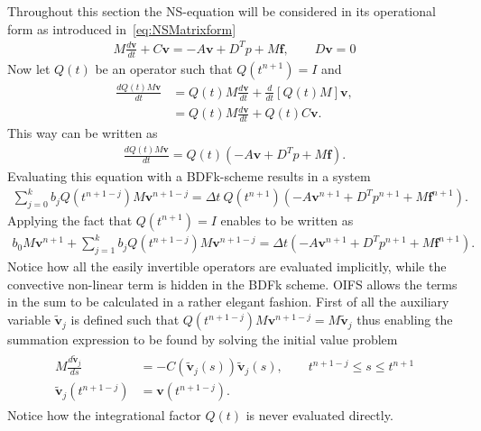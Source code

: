 Throughout this section the NS-equation will be considered in its operational form as introduced in~\ref{eq:NSMatrixform}
%
\begin{align}
    M\frac{d \mathbf{v}}{dt} + C\mathbf{v} = -A\mathbf{v} +D^T p +M\mathbf{f}, \qquad D\mathbf{v} = 0
    \label{eq:NSoperator}
\end{align}
%
Now let $Q(t)$ be an operator such that $Q(t^{n+1}) = I$ and 
%
\begin{align}
    \frac{dQ(t)M\mathbf{v}}{dt} &=  Q(t)M\frac{d\mathbf{v}}{dt} + \frac{d}{dt}\left[  Q(t)M\right]\mathbf{v},\\
    &= Q(t)M\frac{d\mathbf{v}}{dt} + Q(t)C\mathbf{v}. 
    \label{eq:integrationalfactor}
\end{align}
%
This way  can be written as 
\begin{align}
    \frac{d Q(t)M\mathbf{v}}{dt} =Q(t)( -A\mathbf{v} +D^T p +M\mathbf{f}).
    \label{eq:NSoperatorOIFS}
\end{align}
Evaluating this equation with a BDFk-scheme results in a system 
\begin{align}
    \sum_{j=0}^{k}b_jQ(t^{n+1-j})M\mathbf{v}^{n+1-j} =\Delta t \: Q(t^{n+1})( -A\mathbf{v}^{n+1} +D^T p^{n+1} +M\mathbf{f}^{n+1}).
    \label{eq:NSOIFS1}
\end{align}
Applying the fact that $Q(t^{n+1}) = I$ enables  to be written as 
\begin{align}
    b_0M\mathbf{v}^{n+1} + \sum_{j=1}^{k}b_jQ(t^{n+1-j})M\mathbf{v}^{n+1-j} 
    =\Delta t ( -A\mathbf{v}^{n+1} +D^T p^{n+1} +M\mathbf{f}^{n+1}).
    \label{eq:NSOIFS1}
\end{align}
Notice how all the easily invertible operators are evaluated implicitly, while the convective non-linear term is hidden in the BDFk scheme. 
OIFS allows the terms in the sum to be calculated in a rather elegant fashion.
First of all the auxiliary variable $\tilde{\mathbf{v}}_j$ is defined such that $Q(t^{n+1-j})M\mathbf{v}^{n+1-j} = M\tilde{\mathbf{v}}_j$
thus enabling the summation expression to be found by solving the initial value problem 
\begin{align}
    \begin{split}
    M\frac{d\tilde{\mathbf{v}}_j}{ds} &= -C(\tilde{\mathbf{v}}_j(s))\tilde{\mathbf{v}}_j(s) , \qquad t^{n+1-j}\leq s\leq t^{n+1}\\
    \tilde{\mathbf{v}}_j(t^{n+1-j}) &= \mathbf{v}(t^{n+1-j}).
    \end{split}
    \label{eq:IVP}
\end{align}
Notice how the integrational factor $Q(t)$ is never evaluated directly.


